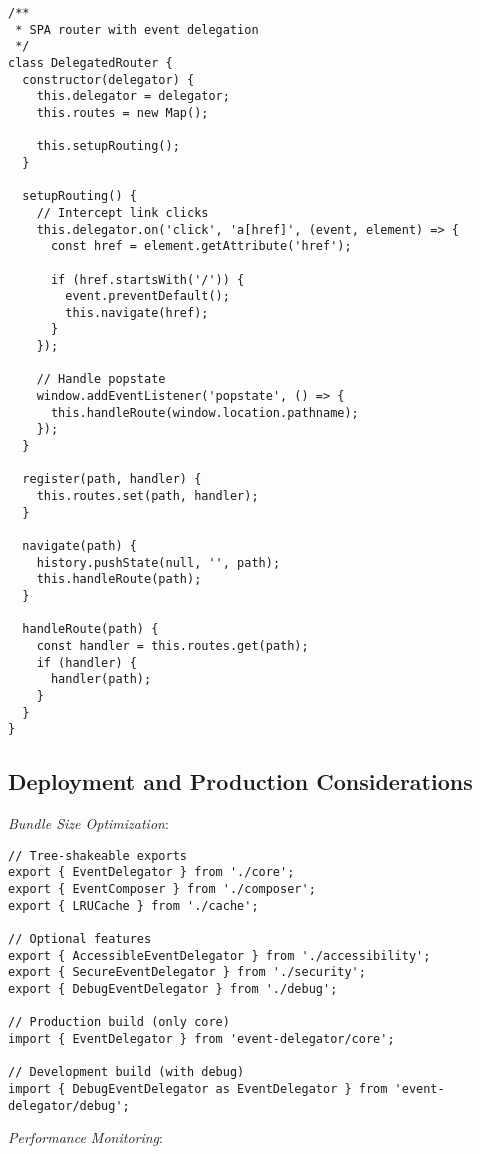 \documentclass[11pt]{article}
\begin{document}
\begin{verbatim}
/**
 * SPA router with event delegation
 */
class DelegatedRouter {
  constructor(delegator) {
    this.delegator = delegator;
    this.routes = new Map();
    
    this.setupRouting();
  }
  
  setupRouting() {
    // Intercept link clicks
    this.delegator.on('click', 'a[href]', (event, element) => {
      const href = element.getAttribute('href');
      
      if (href.startsWith('/')) {
        event.preventDefault();
        this.navigate(href);
      }
    });
    
    // Handle popstate
    window.addEventListener('popstate', () => {
      this.handleRoute(window.location.pathname);
    });
  }
  
  register(path, handler) {
    this.routes.set(path, handler);
  }
  
  navigate(path) {
    history.pushState(null, '', path);
    this.handleRoute(path);
  }
  
  handleRoute(path) {
    const handler = this.routes.get(path);
    if (handler) {
      handler(path);
    }
  }
}
\end{verbatim}
\subsection{Deployment and Production Considerations}
\label{sec:orga64d8d5}

\emph{Bundle Size Optimization}:

\begin{verbatim}
// Tree-shakeable exports
export { EventDelegator } from './core';
export { EventComposer } from './composer';
export { LRUCache } from './cache';

// Optional features
export { AccessibleEventDelegator } from './accessibility';
export { SecureEventDelegator } from './security';
export { DebugEventDelegator } from './debug';

// Production build (only core)
import { EventDelegator } from 'event-delegator/core';

// Development build (with debug)
import { DebugEventDelegator as EventDelegator } from 'event-delegator/debug';
\end{verbatim}

\emph{Performance Monitoring}:
\end{document}
